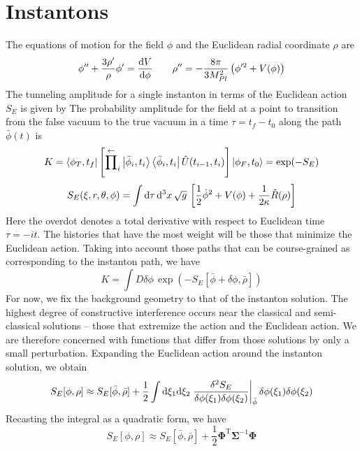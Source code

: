 \section{Instantons}

The equations of motion for the field $\phi$ and the Euclidean radial coordinate $\rho$ are
\[ \phi'' + \frac{3 \rho'}{\rho} \phi' = \frac{\mathrm d V}{\mathrm d \phi} \qquad \rho'' = -\frac{8\pi}{3M_{Pl}^2} \left( \phi'^2 + V(\phi) \right) \]
The tunneling amplitude for a single instanton in terms of the Euclidean action $S_E$ is given by
The probability amplitude for the field at a point to transition from the false vacuum to the true vacuum in a time $\tau = t_f - t_0$ along the path $\bar\phi(t)$ is
\[ K = \left\langle \phi_T,t_f \right\rvert \left[ \overset\leftarrow\prod_i \left\lvert \bar\phi_i,t_i \right\rangle\left\langle \bar\phi_i,t_i \right\rvert \hat U(t_{i-1},t_i) \right] \left\lvert \phi_F,t_0 \right\rangle = \exp(-S_E) \]
\[ S_E(\xi,r,\theta,\phi) = \int \mathrm d\tau \,\mathrm d^3 x \,\sqrt{g} \, \left[ \frac12 \dot\phi^2 + V(\phi) + \frac{1}{2\kappa} \tilde R(\rho) \right] \]
Here the overdot denotes a total derivative with respect to Euclidean time $\tau = -it$.  The histories that have the most weight will be those that minimize the Euclidean action.  Taking into account those paths that can be course-grained as corresponding to the instanton path, we have
\[ K = \int D\delta\phi \, \exp(-S_E[\bar\phi+\delta\phi,\bar\rho]) \]
For now, we fix the background geometry to that of the instanton solution.  The highest degree of constructive interference occurs near the classical and semi-classical solutions -- those that extremize the action and the Euclidean action.  We are therefore concerned with functions that differ from those solutions by only a small perturbation.  Expanding the Euclidean action around the instanton solution, we obtain
\[ S_E[\phi,\rho] \approx S_E[\bar\phi,\bar\rho] + \frac12 \int \mathrm d\xi_1 \mathrm d\xi_2 \left. \frac{\delta ^2S_E}{\delta \phi(\xi_1) \delta\phi(\xi_2)} \right\rvert_{\bar\phi} \delta\phi(\xi_1) \delta\phi(\xi_2) \]
Recasting the integral as a quadratic form, we have
\[ S_E[\phi,\rho] \approx S_E[\bar\phi,\bar\rho] + \frac12 {\mathbf \Phi}^{\mathrm T} \mathbf\Sigma^{-1} \mathbf\Phi \]
